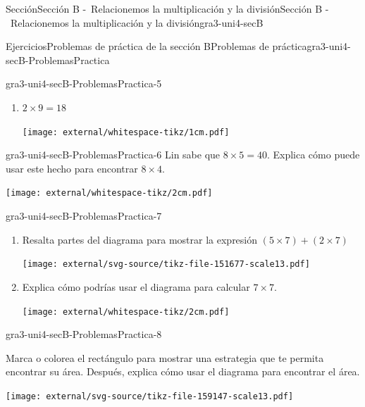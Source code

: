 \begin{sectionptx}{Sección}{Sección B -~Relacionemos la multiplicación y la división}{}{Sección B -~Relacionemos la multiplicación y la división}{}{}{gra3-uni4-secB}
\begin{exercises-subsection}{Ejercicios}{Problemas de práctica de la sección B}{}{Problemas de práctica}{}{}{gra3-uni4-secB-ProblemasPractica}
\begin{divisionexercise}{3}{}{}{gra3-uni4-secB-ProblemasPractica-5}
\begin{enumerate}[label={(\alph*)}]
\begin{image}{0}{1}{0}{}%
\texttt{[image: external/whitespace-tikz/1cm.pdf]}
\end{image}%
\item{}\(\displaystyle 2 \times 9 = 18\)%
\begin{image}{0}{1}{0}{}%
\texttt{[image: external/whitespace-tikz/1cm.pdf]}
\end{image}%
\end{enumerate}
\end{divisionexercise}%
\begin{divisionexercise}{4}{}{}{gra3-uni4-secB-ProblemasPractica-6}%
Lin sabe que \(8 \times 5 = 40\). Explica cómo puede usar este hecho para encontrar \(8 \times 4\).%
\begin{image}{0}{1}{0}{}%
\texttt{[image: external/whitespace-tikz/2cm.pdf]}
\end{image}%
\end{divisionexercise}%
\begin{divisionexercise}{5}{}{}{gra3-uni4-secB-ProblemasPractica-7}%
%
\vspace{-1.4\baselineskip}
\begin{enumerate}[label={(\alph*)}]
\item{}Resalta partes del diagrama para mostrar la expresión \((5 \times 7) + (2 \times 7)\)%
\begin{image}{0}{1}{0}{}%
\texttt{[image: external/svg-source/tikz-file-151677-scale13.pdf]}
\end{image}%
\item{}Explica cómo podrías usar el diagrama para calcular \(7\times 7\).%
\begin{image}{0}{1}{0}{}%
\texttt{[image: external/whitespace-tikz/2cm.pdf]}
\end{image}%
\end{enumerate}
\end{divisionexercise}%
\begin{divisionexercise}{6}{}{}{gra3-uni4-secB-ProblemasPractica-8}%
\vspace{-1.4\baselineskip}
\begin{sidebyside}{2}{0}{0}{0}%
\begin{sbspanel}{0.6}%
Marca o colorea el rectángulo para mostrar una estrategia que te permita encontrar su área. Después, explica cómo usar el diagrama para encontrar el área.%
\end{sbspanel}%
\begin{sbspanel}{0.4}%
\texttt{[image: external/svg-source/tikz-file-159147-scale13.pdf]}

\end{sbspanel}
\end{sidebyside}
\end{divisionexercise}
\end{exercises-subsection}
\end{sectionptx}
